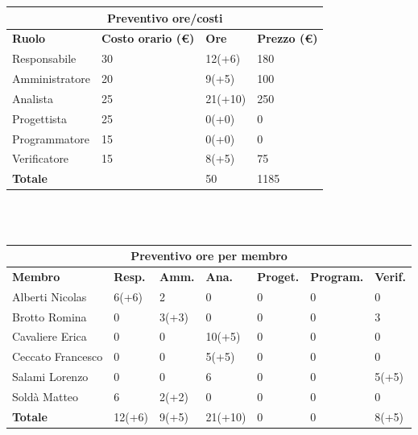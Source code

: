 \documentclass[a4paper, 12pt]{article}
\begin{document}
\begin{center}
	\begin{tabularx}{\textwidth}{|X|X|X|X|}
		\hline
		\multicolumn{4}{|c|}{\textbf{Preventivo ore/costi}}                                      \\
		\hline
		\hline
		\textbf{Ruolo}  & \textbf{Costo orario (\euro)} & \textbf{Ore} & \textbf{Prezzo (\euro)} \\
		\hline
		Responsabile    & 30                            & 12(+6)       & 180                     \\
		\hline
		Amministratore  & 20                            & 9(+5)        & 100                      \\
		\hline
		Analista        & 25                            & 21(+10)       & 250                     \\
		\hline
		Progettista     & 25                            & 0(+0)        & 0                       \\
		\hline
		Programmatore   & 15                            & 0(+0)        & 0                       \\
		\hline
		Verificatore    & 15                            & 8(+5)        & 75                      \\
		\hline
		\hline
		\textbf{Totale} &                               & 50           & 1185                    \\
		\hline
	\end{tabularx}\\[8pt]
	\mbox{}\\
\end{center}


\begin{center}
	\begin{tabularx}{\textwidth}{|X|X|X|X|X|X|X|}
		\hline
		\multicolumn{7}{|c|}{\textbf{Preventivo ore per membro}}                                      \\
		\hline
		\hline
		\textbf{Membro}  & \textbf{Resp.} & \textbf{Amm.} & \textbf{Ana.} &
		\textbf{Proget.} & \textbf{Program.} & \textbf{Verif.} \\
		\hline
		Alberti Nicolas    	&6(+6) 	&2	&0	&0	&0	&0	\\
		\hline
		Brotto Romina    	&0 	&3(+3)	&0	&0	&0	&3	\\
		\hline
		Cavaliere Erica    	&0 	&0  &10(+5)  &0 &0 &0	\\
		\hline
		Ceccato Francesco   &0 	&0  &5(+5)  &0 &0 &0	\\
		\hline
		Salami Lorenzo    	&0 	&0  &6 &0 &0 &5(+5)	\\
		\hline
		Soldà Matteo    	&6	&2(+2)  &0  &0 &0 &0	\\
		\hline
		\hline
		\textbf{Totale} 	& 12(+6) & 9(+5) & 21(+10) & 0 & 0 & 8(+5)	\\
		\hline
	\end{tabularx}\\[8pt]
	\mbox{}\\
\end{center}
\end{document}
